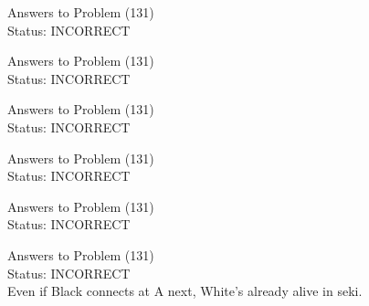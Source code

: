 \documentclass[11pt]{article}
\begin{document}
\begin{minipage}[t]{0.5\textwidth}
  {\centering
  
  Answers to Problem (131)\\
  Status: INCORRECT\\
  
  }
\end{minipage}
\begin{minipage}[t]{0.5\textwidth}
  {\centering
  
  Answers to Problem (131)\\
  Status: INCORRECT\\
  
  }
\end{minipage}
\begin{minipage}[t]{0.5\textwidth}
  {\centering
  
  Answers to Problem (131)\\
  Status: INCORRECT\\
  
  }
\end{minipage}
\begin{minipage}[t]{0.5\textwidth}
  {\centering
  
  Answers to Problem (131)\\
  Status: INCORRECT\\
  
  }
\end{minipage}
\begin{minipage}[t]{0.5\textwidth}
  {\centering
  
  Answers to Problem (131)\\
  Status: INCORRECT\\
  
  }
\end{minipage}
\begin{minipage}[t]{0.5\textwidth}
  {\centering
  
  Answers to Problem (131)\\
  Status: INCORRECT\\
  Even if Black connects at A next, White's already alive in seki.\\
  }
\end{minipage}
\end{document}

